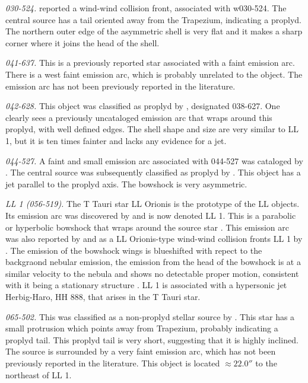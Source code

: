 \documentclass{article}
\begin{document}
\textit{030-524.} \citet{Bally:2000a} reported a wind-wind collision front, associated with w030-524. The central source has a tail oriented away from the Trapezium, indicating a proplyd. The northern outer edge of the asymmetric shell is very flat and it makes a sharp corner where it joins the head of the shell.

\textit{041-637.} This is a previously reported star \citep{Rio:2012} associated with a faint emission arc. There is a west faint emission arc, which is probably unrelated to the object. The emission arc has not been previously reported in the literature.

\textit{042-628.} This object was classified as proplyd by \citet{Ricci:2008}, designated 038-627. One clearly sees a previously uncataloged emission arc that wraps around this proplyd, with well defined edges. The shell shape and size are very similar to LL 1, but it is ten times fainter and lacks any evidence for a jet.    

\textit{044-527.} A faint and small emission arc associated with 044-527 was cataloged by \citet{Bally:2000a}. The central source was subsequently classified as proplyd by \citet{Ricci:2008}. This object has a jet parallel to the proplyd axis. The bowshock is very asymmetric.

\textit{LL 1 (056-519).} The T Tauri star LL Orionis is the prototype of the LL objects. Its emission arc was discovered by \citet{Gull:1979a} and is now denoted LL 1. This is a parabolic or hyperbolic bowshock that wraps around the source star \citep{Bally:2006a}. This emission arc was also reported by \citet{Bally:2000a} and as a LL Orionis-type wind-wind collision fronts LL 1 by \citet{Bally:2001}. The emission of the bowshock wings is blueshifted with repect to the backgraond nebular emission, the emission from the head of the bowshock is at a similar velocity to the nebula and shows no detectable proper motion, consistent with it being a stationary structure \citep{Henney:2013a}. LL 1 is associated with a hypersonic jet Herbig-Haro, HH 888, that arises in the T Tauri star.

\textit{065-502.} This was classified as a  non-proplyd stellar source by \citet{Odell:1996}. This star has a small protrusion which points away from Trapezium, probably indicating a proplyd tail. This proplyd tail is very short, suggesting that it is highly inclined. The source is surrounded by a very faint emission arc, which has not been previously reported in the literature. This object is located \(\approx 22.0''\) to the northeast of LL 1.    
\end{document}
